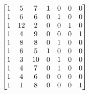 \documentclass[preview]{standalone}
\begin{document}
\begin{align*}
\special{dvisvgm:raw <g id='unique000'>}\begin{bmatrix}1&5&7&1&0&0&0\\1&6&6&0&1&0&0\\1&12&2&0&0&1&0\\1&4&9&0&0&0&1\\1&8&8&0&1&0&0\\1&6&5&1&0&0&0\\1&3&10&0&1&0&0\\1&4&7&0&1&0&0\\1&4&6&0&0&0&0\\1&1&8&0&0&0&1\end{bmatrix}\special{dvisvgm:raw </g>}
\end{align*}
\end{document}
